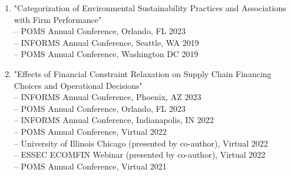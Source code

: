 \documentclass[margin,line]{resume}
\begin{document}
\begin{resume}
\begin{enumerate}[topsep=0pt, leftmargin=*]
 	     \item "Categorization of Environmental Sustainability Practices and Associations with Firm Performance"\\[0.3em]
  	     -- POMS Annual Conference, Orlando, FL \hfill   2023\\
 	           -- INFORMS Annual Conference, Seattle, WA \hfill2019\\
 	           -- POMS Annual Conference, Washington DC \hfill2019
\\
  	     \item "Effects of Financial Constraint Relaxation on Supply Chain Financing Choices and Operational Decisions"\\[0.3em]
  	    -- INFORMS Annual Conference, Phoenix, AZ \hfill 2023\\ 
        -- POMS Annual Conference, Orlando, FL \hfill   2023\\
  	     -- INFORMS Annual Conference, Indianapolis, IN \hfill  2022\\
  	     -- POMS Annual Conference, Virtual \hfill2022\\
  	     -- University of Illinois Chicago (presented by co-author), Virtual \hfill 2022\\
 	           -- ESSEC ECOMFIN Webinar (presented by co-author), Virtual \hfill 2022\\
 	           -- POMS Annual Conference, Virtual \hfill2021
 	           

 	  \end{enumerate}

         

\end{resume}
\end{document}
